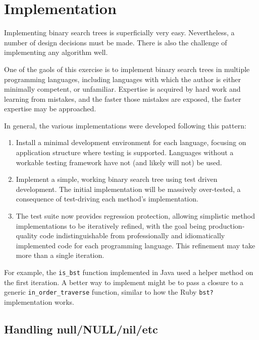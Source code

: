 \documentclass{article}
\begin{document}
{}



\appendix

\section{Implementation}

Implementing binary search trees is superficially very easy. Nevertheless,
a number of design decisions must be made. There is also the challenge of
implementing any algorithm well.

One of the gaols of this exercise is to implement binary search trees in multiple
programming languages, including languages with which the author is either
minimally competent, or unfamiliar. Expertise is acquired by hard work and
learning from mistakes, and the faster those mistakes are exposed, the
faster expertise may be approached.

In general, the various implementations were developed following this
pattern:

\begin{enumerate}
\item Install a minimal development environment for each language, focusing on
application structure where testing is supported. Languages without a workable
testing framework have not (and likely will not) be used.
\item Implement a simple, working binary search tree using test driven development.
The initial implementation will be massively over-tested, a consequence of
test-driving each method's implementation.
\item The test suite now provides regression protection, allowing simplistic
method implementations to be iteratively refined, with the goal being production-quality
code indistinguishable from professionally and idiomatically implemented code
for each programming language. This refinement may take more than a single iteration.
\end{enumerate}

For example, the {\tt is\_bst} function implemented in Java used a helper
method on the first iteration. A better way to implement might be to pass
a closure to a generic {\tt in\_order\_traverse} function, similar to how
the Ruby {\tt bst?} implementation works.

\subsection{Handling null/NULL/nil/etc}
\end{document}
